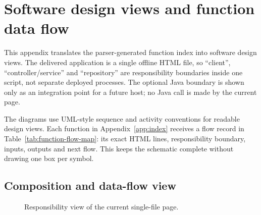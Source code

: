 \chapter{Software design views and function data flow}\label{app:design-views}
This appendix translates the parser-generated function index into software design views. The delivered application is a single offline HTML file, so ``client'', ``controller/service'' and ``repository'' are responsibility boundaries inside one script, not separate deployed processes. The optional Java boundary is shown only as an integration point for a future host; no Java call is made by the current page.

\begin{infobox}
The diagrams use UML-style sequence and activity conventions for readable design views. Each function in Appendix~\ref{app:index} receives a flow record in Table~\ref{tab:function-flow-map}: its exact HTML lines, responsibility boundary, inputs, outputs and next flow. This keeps the schematic complete without drawing one box per symbol.
\end{infobox}

\section{Composition and data-flow view}
\begin{figure}[htbp]\centering
{}
\caption{Responsibility view of the current single-file page.}\label{fig:design-composition}
\end{figure}


